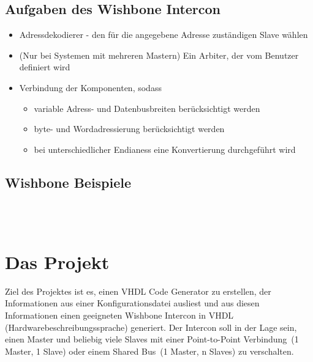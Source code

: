 \documentclass{article}
\begin{document}
\subsection{Aufgaben des Wishbone Intercon}
\begin{itemize}
\item Adressdekodierer - den für die angegebene Adresse zuständigen Slave wählen
\item (Nur bei Systemen mit mehreren Mastern) Ein Arbiter, der vom Benutzer definiert wird
\item Verbindung der Komponenten, sodass
\begin{itemize}
\item variable Adress- und Datenbusbreiten berücksichtigt werden
\item byte- und Wordadressierung berücksichtigt werden
\item bei unterschiedlicher Endianess eine Konvertierung durchgeführt wird
\end{itemize}
\end{itemize}
\subsection{Wishbone Beispiele}

\noindent
{}
\\\\
\noindent
{}

\section{Das Projekt}
Ziel des Projektes ist es, einen VHDL Code Generator zu erstellen,
der Informationen aus einer Konfigurationsdatei ausliest und aus
diesen Informationen einen geeigneten Wishbone Intercon in VHDL (Hardwarebeschreibungssprache) generiert.
Der Intercon soll in der Lage sein, einen Master und beliebig viele Slaves mit einer \glqq Point-to-Point Verbindung\grqq\ (1 Master, 1 Slave) oder einem \glqq Shared Bus\grqq\ (1 Master, n Slaves) zu verschalten.
\end{document}

